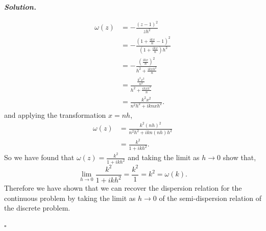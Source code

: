 \documentclass[12pt]{report}
\newenvironment{solution}[1][\it{Solution}]{\textbf{#1. } }{$\square$}
\begin{document}
\begin{solution}
\begin{enumerate}
        \begin{align*}
            \omega(z)&=-\frac{(z-1)^2}{zh^2}\\
            &=-\frac{\left(1+\frac{ikx}{n}-1\right)^2}{\left(1+\frac{ikx}{n}\right)h^2}\\
            &=-\frac{\left(\frac{ikx}{n}\right)^2}{h^2+\frac{ikxh^2}{n}}\\
            &=\frac{\frac{k^2x^2}{n^2}}{h^2+\frac{ikxh^2}{n}}\\
            &=\frac{k^2x^2}{n^2h^2+iknxh^2}.
        \end{align*}
        and applying the transformation $x = nh$,
        \begin{align*}
            \omega(z)&=\frac{k^2(nh)^2}{n^2h^2+ikn(nh)h^2}\\
            &=\frac{k^2}{1+ikh^2}.
        \end{align*}
        So we have found that $\omega(z) = \frac{k^2}{1+ikh^2}$ and taking the limit as $h \rightarrow 0$ show that,
        \[\lim_{h\rightarrow 0}\frac{k^2}{1+ikh^2}=\frac{k^2}{1}=k^2=\omega(k). \]
        Therefore we have shown that we can recover the dispersion relation for the continuous problem by taking the limit as $h\rightarrow 0$ of the semi-dispersion relation of the discrete problem.
    \end{enumerate}

\end{solution}

\end{document}

